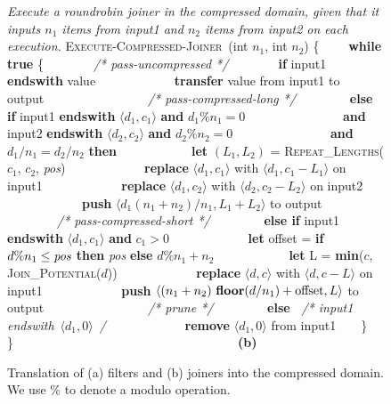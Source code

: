 \begin{figure}[t]
\begin{minipage}{0.53\textwidth}
\end{minipage}
\hspace{0.2in}
\begin{minipage}{0.59\textwidth}
\begin{small}
{\it Execute a roundrobin joiner in the compressed domain, given that
  it inputs $n_1$ items from input1 and $n_2$ items from input2 on
  each execution.}\mynewline
\textsc{Execute-Compressed-Joiner}~(int $n_1$, int $n_2$) \{\mynewline
\mbox{~~~~}{\bf while true} \{\mynewline \mbox{~~~~}\mbox{~~~~}{\it /*
  pass-uncompressed */}\mynewline \mbox{~~~~}\mbox{~~~~}{\bf if}
input1 {\bf endswith} value\mynewline
\mbox{~~~~}\mbox{~~~~}\mbox{~~~~}{\bf transfer} value from input1 to
output\mynewline \mbox{~~~~}\mbox{~~~~}\mynewline
\mbox{~~~~}\mbox{~~~~}{\it /* pass-compressed-long */}\mynewline
\mbox{~~~~}\mbox{~~~~}{\bf else if} input1 {\bf endswith} $\langle
d_1,c_1 \rangle$ {\bf and} $d_1\%n_1 = 0$\mynewline
\mbox{~~~~}\mbox{~~~~}\mbox{~~~~~~~}{\bf and} input2 {\bf endswith}
$\langle d_2,c_2 \rangle$ {\bf and} $d_2\%n_2 = 0$\mynewline
\mbox{~~~~}\mbox{~~~~}\mbox{~~~~~~~}{\bf and} $d_1/n_1 = d_2/n_2$ {\bf
  then}\mynewline \mbox{~~~~}\mbox{~~~~}\mbox{~~~~}{\bf let} $(L_1,
L_2)$ = \textsc{Repeat\_Lengths}($c_1$, $c_2$, {\it pos})\mynewline
\mbox{~~~~}\mbox{~~~~}\mbox{~~~~}{\bf replace} $\langle d_1, c_1
\rangle$ with $\langle d_1, c_1-L_1\rangle$ on input1\mynewline
\mbox{~~~~}\mbox{~~~~}\mbox{~~~~}{\bf replace} $\langle d_1, c_2
\rangle$ with $\langle d_2, c_2-L_2\rangle$ on input2\mynewline
\mbox{~~~~}\mbox{~~~~}\mbox{~~~~}{\bf push} $\langle d_1(n_1+n_2)/n_1,
L_1+L_2 \rangle$ to output\mynewline \mbox{~~~~}\mbox{~~~~}\mynewline
\mbox{~~~~}\mbox{~~~~}{\it /* pass-compressed-short */}\mynewline
\mbox{~~~~}\mbox{~~~~}{\bf else if} input1 {\bf endswith} $\langle
d_1,c_1 \rangle$ {\bf and} $c_1>0$\mynewline
\mbox{~~~~}\mbox{~~~~}\mbox{~~~~}{\bf let} offset = {\bf if} $d\%n_1
\leq \mbox{\it pos}$ {\bf then} {\it pos} {\bf else} $d\%n_1 +
n_2$\mynewline \mbox{~~~~}\mbox{~~~~}\mbox{~~~~}{\bf let} L = {\bf
  min}($c$, \textsc{Join\_Potential}($d$))\mynewline
\mbox{~~~~}\mbox{~~~~}\mbox{~~~~}{\bf replace} $\langle d, c\rangle$
with $\langle d, c - L\rangle$ on input1\mynewline
\mbox{~~~~}\mbox{~~~~}\mbox{~~~~}{\bf push} $\langle
(n_1+n_2)~\mbox{\bf floor}(d/n_1) + \mbox{offset}, L \rangle$ to
output\mynewline \mbox{~~~~}\mbox{~~~~}\mynewline
\mbox{~~~~}\mbox{~~~~}{\it /* prune */}\mynewline
\mbox{~~~~}\mbox{~~~~}{\bf else~} {\it /* input1 endswith}~$\langle
d_1, 0 \rangle$~{\it */}\mynewline
\mbox{~~~~}\mbox{~~~~}\mbox{~~~~}{\bf remove} $\langle d_1,0 \rangle$
from input1\mynewline \mbox{~~~~}\}\mynewline
\}~~~~~~~~~~~~~~~~~~~~~~~~~~~~~~~~~~~~{\bf (b)}\mynewline
\end{small}
\end{minipage}
\vspace{-1.5\baselineskip}
\caption{Translation of (a) filters and (b) joiners into the
  compressed domain.  We use $\%$ to denote a modulo operation.
\protect\label{fig:translate}}
\vspace{-4pt}
\end{figure}

